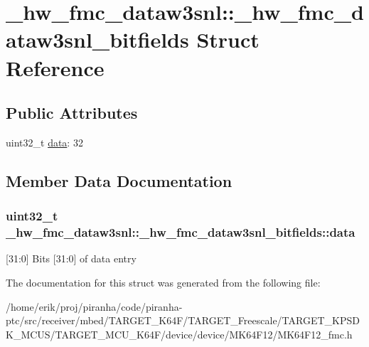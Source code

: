 \hypertarget{struct__hw__fmc__dataw3snl_1_1__hw__fmc__dataw3snl__bitfields}{}\section{\+\_\+hw\+\_\+fmc\+\_\+dataw3snl\+:\+:\+\_\+hw\+\_\+fmc\+\_\+dataw3snl\+\_\+bitfields Struct Reference}
\label{struct__hw__fmc__dataw3snl_1_1__hw__fmc__dataw3snl__bitfields}
\subsection*{Public Attributes}
\begin{DoxyCompactItemize}
\item 
uint32\+\_\+t \hyperlink{struct__hw__fmc__dataw3snl_1_1__hw__fmc__dataw3snl__bitfields_a3f3895241b6ecd8af79306e3a7eb8c4b}{data}\+: 32
\end{DoxyCompactItemize}


\subsection{Member Data Documentation}
\subsubsection[{\texorpdfstring{data}{data}}]{\setlength{\rightskip}{0pt plus 5cm}uint32\+\_\+t \+\_\+hw\+\_\+fmc\+\_\+dataw3snl\+::\+\_\+hw\+\_\+fmc\+\_\+dataw3snl\+\_\+bitfields\+::data}\hypertarget{struct__hw__fmc__dataw3snl_1_1__hw__fmc__dataw3snl__bitfields_a3f3895241b6ecd8af79306e3a7eb8c4b}{}\label{struct__hw__fmc__dataw3snl_1_1__hw__fmc__dataw3snl__bitfields_a3f3895241b6ecd8af79306e3a7eb8c4b}
\mbox{[}31\+:0\mbox{]} Bits \mbox{[}31\+:0\mbox{]} of data entry 

The documentation for this struct was generated from the following file\+:\begin{DoxyCompactItemize}
\item 
/home/erik/proj/piranha/code/piranha-\/ptc/src/receiver/mbed/\+T\+A\+R\+G\+E\+T\+\_\+\+K64\+F/\+T\+A\+R\+G\+E\+T\+\_\+\+Freescale/\+T\+A\+R\+G\+E\+T\+\_\+\+K\+P\+S\+D\+K\+\_\+\+M\+C\+U\+S/\+T\+A\+R\+G\+E\+T\+\_\+\+M\+C\+U\+\_\+\+K64\+F/device/device/\+M\+K64\+F12/M\+K64\+F12\+\_\+fmc.\+h\end{DoxyCompactItemize}
